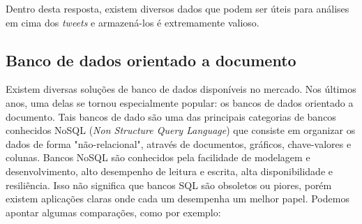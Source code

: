 Dentro desta resposta, existem diversos dados que podem ser úteis para análises em cima dos \textit{tweets} e armazená-los é extremamente valioso.

\subsection{Banco de dados orientado a documento}

Existem diversas soluções de banco de dados disponíveis no mercado. Nos últimos anos, uma delas se tornou especialmente popular\cite{bhuvan2015technical}: os bancos de dados orientado a documento. Tais bancos de dado são uma das principais categorias de bancos conhecidos NoSQL (\textit{Non Structure Query Language}) que consiste em organizar os dados de forma "não-relacional", através de documentos, gráficos, chave-valores e colunas. Bancos NoSQL são conhecidos pela facilidade de modelagem e desenvolvimento, alto desempenho de leitura e escrita, alta disponibilidade e resiliência. Isso não significa que bancos SQL são obsoletos ou piores, porém existem aplicações claras onde cada um desempenha um melhor papel. Podemos apontar algumas comparações, como por exemplo:

